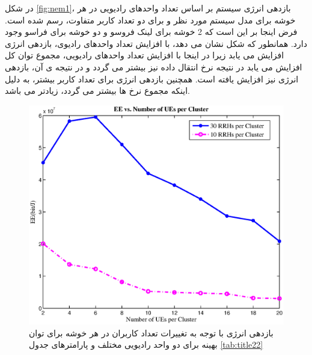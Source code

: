  در شکل \ref{fig:nem1}، بازدهی انرژی سیستم  بر اساس تعداد واحدهای رادیویی در هر خوشه برای مدل سیستم مورد نظر و برای دو تعداد کاربر متفاوت، رسم شده است. فرض اینجا بر این است که 2 خوشه برای لینک فروسو و دو خوشه برای فراسو وجود دارد.
 همانطور که  شکل  نشان می دهد، با افزایش تعداد واحدهای رادیوی، بازدهی انرژی افزایش می یابد زیرا  در اینجا با افزایش تعداد واحدهای رادیویی، مجموع توان کل افزایش می یابد در نتیجه نرخ انتقال داده نیز بیشتر می گردد و در نتیجه ی آن، بازدهی انرژی نیز افزایش یافته است. همچنین بازدهی انرژی برای تعداد کاربر بیشتر، به دلیل اینکه مجموع نرخ ها بیشتر می گردد، زیادتر می باشد.
 \begin{figure}[H]
  \centering
    \includegraphics[width=\linewidth]{./fig3/ue4}
  \caption{  بازدهی انرژی با توجه به تغییرات تعداد کاربران در هر خوشه برای توان بهینه برای 
   دو واحد رادیویی مختلف
   و پارامترهای جدول
    \ref{tab:title22} }
  \label{fig:ue4}
\end{figure}

